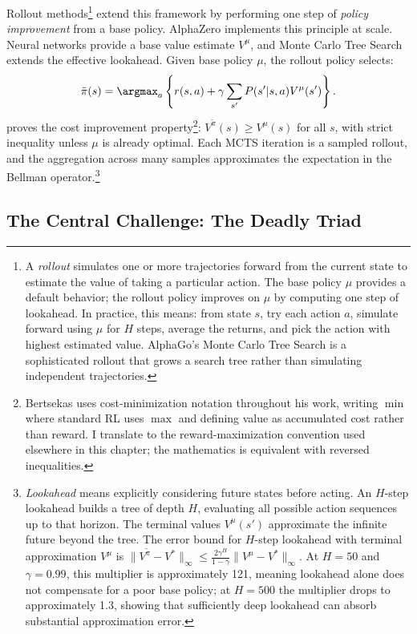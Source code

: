 Rollout methods\footnote{A \emph{rollout} simulates one or more trajectories forward from the current state to estimate the value of taking a particular action. The base policy $\mu$ provides a default behavior; the rollout policy improves on $\mu$ by computing one step of lookahead. In practice, this means: from state $s$, try each action $a$, simulate forward using $\mu$ for $H$ steps, average the returns, and pick the action with highest estimated value. AlphaGo's Monte Carlo Tree Search is a sophisticated rollout that grows a search tree rather than simulating independent trajectories.} extend this framework by performing one step of \emph{policy improvement} from a base policy. AlphaZero \citep{Silver2018} implements this principle at scale. Neural networks provide a base value estimate $V^\mu$, and Monte Carlo Tree Search extends the effective lookahead. Given base policy $\mu$, the rollout policy selects:
\begin{equation}
\tilde{\pi}(s) = \argmax_a \left\{ r(s,a) + \gamma \sum_{s'} P(s'|s,a) V^\mu(s') \right\}.
\end{equation}
\citet{bertsekas2021lessons} proves the cost improvement property\footnote{Bertsekas uses cost-minimization notation throughout his work, writing $\min$ where standard RL uses $\max$ and defining value as accumulated cost rather than reward. I translate to the reward-maximization convention used elsewhere in this chapter; the mathematics is equivalent with reversed inequalities.}: $V^{\tilde{\pi}}(s) \geq V^\mu(s)$ for all $s$, with strict inequality unless $\mu$ is already optimal. Each MCTS iteration is a sampled rollout, and the aggregation across many samples approximates the expectation in the Bellman operator.\footnote{\emph{Lookahead} means explicitly considering future states before acting. An $H$-step lookahead builds a tree of depth $H$, evaluating all possible action sequences up to that horizon. The terminal values $V^\mu(s')$ approximate the infinite future beyond the tree. The error bound for $H$-step lookahead with terminal approximation $V^\mu$ is $\|V^{\tilde{\pi}} - V^*\|_\infty \leq \frac{2\gamma^H}{1-\gamma} \|V^\mu - V^*\|_\infty$. At $H=50$ and $\gamma=0.99$, this multiplier is approximately 121, meaning lookahead alone does not compensate for a poor base policy; at $H=500$ the multiplier drops to approximately 1.3, showing that sufficiently deep lookahead can absorb substantial approximation error.}


\subsection{The Central Challenge: The Deadly Triad}
\label{sec:deadly_triad}

